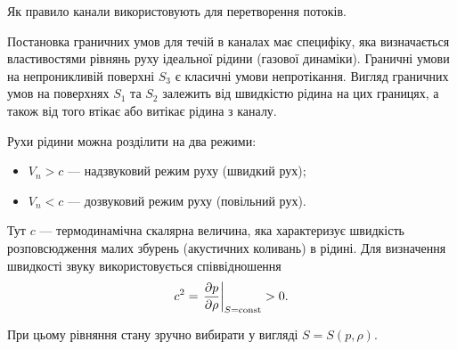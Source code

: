 Як правило канали використовують для перетворення потоків. \medskip

Постановка граничних умов для течій в каналах має специфіку, яка визначається властивостями рівнянь руху ідеальної рідини (газової динаміки). Граничні умови на непроникливій поверхні $S_3$ є класичні умови непротікання. Вигляд граничних умов на поверхнях $S_1$ та $S_2$ залежить від швидкістю рідина на цих границях, а також від того втікає або витікає рідина з каналу. \medskip

Рухи рідини можна розділити на два режими:
\begin{itemize}
	\item $V_n > c$ --- надзвуковий режим руху (швидкий рух);
	\item $V_n < c$ --- дозвуковий режим руху (повільний рух).
\end{itemize}

\begin{remark}
	Тут $c$ --- термодинамічна скалярна величина, яка характеризує швидкість розповсюдження малих збурень (акустичних коливань) в рідині. Для визначення швидкості звуку використовується співвідношення
	\begin{equation}
		c^2 = \left. \frac{\partial p}{\partial \rho} \right|_{S = \operatorname{const}} > 0.
	\end{equation}
\end{remark}

При цьому рівняння стану зручно вибирати у вигляді $S = S(p, \rho)$.

